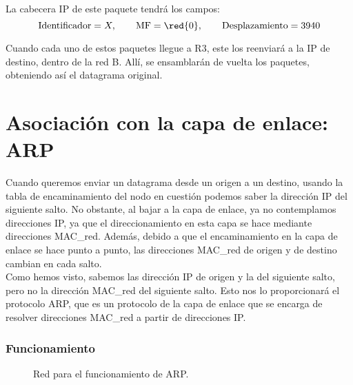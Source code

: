\begin{ejemplo}
\begin{enumerate}
        La cabecera IP de este paquete tendrá los campos:
        \begin{equation*}
            \text{Identificador} = X,\qquad \text{MF} = \red{0},\qquad \text{Desplazamiento} = 3940
        \end{equation*}
    \end{enumerate}

    Cuando cada uno de estos paquetes llegue a R3, este los reenviará a la IP de destino, dentro de la red B. Allí, se ensamblarán de vuelta los paquetes, obteniendo así el datagrama original.
\end{ejemplo}


\section{Asociación con la capa de enlace: \acrfull{ARP}}
Cuando queremos enviar un datagrama desde un origen a un destino, usando la tabla de encaminamiento del nodo en cuestión podemos saber la dirección IP del siguiente salto. No obstante, al bajar a la capa de enlace, ya no contemplamos direcciones IP\@, ya que el direccionamiento en esta capa se hace mediante direcciones \acrshort{MAC_red}. Además, debido a que el encaminamiento en la capa de enlace se hace punto a punto, las direcciones \acrshort{MAC_red} de origen y de destino cambian en cada salto.\\

Como hemos visto, sabemos las dirección IP de origen y la del siguiente salto, pero no la dirección \acrshort{MAC_red} del siguiente salto. Esto nos lo proporcionará el protocolo \acrshort{ARP}, que es un protocolo de la capa de enlace que se encarga de resolver direcciones \acrshort{MAC_red} a partir de direcciones IP\@.

\subsubsection{Funcionamiento}

\begin{figure}
    \centering
    \caption{Red para el funcionamiento de \acrshort{ARP}.}
    \label{fig:arp}
\end{figure}

